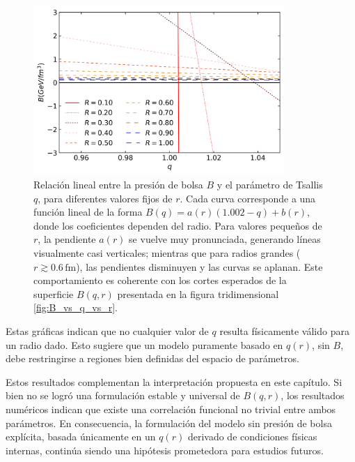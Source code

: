 \begin{figure}[H]
    \centering
    \includegraphics[width=0.85\textwidth]{./Images/BvsQcuts.png}
    \caption[Cortes radiales de \( B \) en función de \( q \)]{Relación lineal entre la presión de bolsa \( B \) y el parámetro de Tsallis \( q \), para diferentes valores fijos de \( r \). 
Cada curva corresponde a una función lineal de la forma \( B(q) = a(r)(1.002 - q) + b(r) \), donde los coeficientes dependen del radio. 
Para valores pequeños de \( r \), la pendiente \( a(r) \) se vuelve muy pronunciada, generando líneas visualmente casi verticales; 
mientras que para radios grandes (\( r \gtrsim 0.6\,\text{fm} \)), las pendientes disminuyen y las curvas se aplanan. 
Este comportamiento es coherente con los cortes esperados de la superficie \( B(q, r) \) presentada en la figura tridimensional \ref{fig:B_vs_q_vs_r}.
}
    \label{fig:BvsQcuts}
\end{figure}

\begin{remark}
    Estas gráficas indican que no cualquier valor de \( q \) resulta físicamente válido para un radio dado. Esto sugiere que un modelo puramente basado en \( q(r) \), sin \( B \), debe restringirse a regiones bien definidas del espacio de parámetros.
\end{remark}

Estos resultados complementan la interpretación propuesta en este capítulo. Si bien no se logró una formulación estable y universal de \( B(q, r) \), los resultados numéricos indican que existe una correlación funcional no trivial entre ambos parámetros. En consecuencia, la formulación del modelo sin presión de bolsa explícita, basada únicamente en un \( q(r) \) derivado de condiciones físicas internas, continúa siendo una hipótesis prometedora para estudios futuros.

